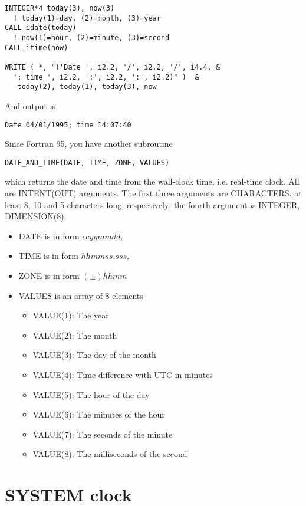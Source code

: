 \begin{lstlisting}
INTEGER*4 today(3), now(3)
  ! today(1)=day, (2)=month, (3)=year
CALL idate(today)   
  ! now(1)=hour, (2)=minute, (3)=second
CALL itime(now)     

WRITE ( *, "('Date ', i2.2, '/', i2.2, '/', i4.4, &
  '; time ', i2.2, ':', i2.2, ':', i2.2)" )  &
   today(2), today(1), today(3), now
\end{lstlisting}
And output is 
\begin{verbatim}
Date 04/01/1995; time 14:07:40
\end{verbatim}

Since Fortran 95, you have another subroutine
\begin{lstlisting}
DATE_AND_TIME(DATE, TIME, ZONE, VALUES)
\end{lstlisting}
which returns the date and time from the wall-clock time,
i.e. real-time clock. All are INTENT(OUT) arguments. The first three
arguments are CHARACTERS, at least 8, 10 and 5 characters long,
respectively; the fourth argument is INTEGER, DIMENSION(8).
\begin{itemize}
\item  DATE is in form $ccyymmdd$, 

\item TIME is in form $hhmmss.sss$, 

\item ZONE is in form $(\pm)hhmm$

\item VALUES is an array of 8 elements

  \begin{itemize}
  \item   VALUE(1):   The year
\item  VALUE(2):   The month
\item  VALUE(3):   The day of the month
\item   VALUE(4):   Time difference with UTC in minutes
\item   VALUE(5):   The hour of the day
\item   VALUE(6):   The minutes of the hour
\item   VALUE(7):   The seconds of the minute
\item VALUE(8): The milliseconds of the second
  \end{itemize}
\end{itemize}

\section{SYSTEM clock}
\label{sec:system-clock}


